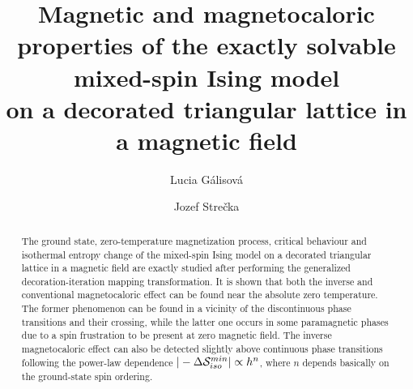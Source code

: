 \documentclass[final,5p,times,sort&compress]{elsarticle}
\begin{document}
\begin{frontmatter}



\title{Magnetic and magnetocaloric properties of the exactly solvable mixed-spin Ising model \\
on a decorated triangular lattice in a magnetic field}


\author[label1]{Lucia G\'alisov\'a}
\author[label2]{Jozef Stre\v{c}ka}

\address[label1]{Department of Applied Mathematics and Informatics,
					Faculty of Mechanical Engineering, Technical University,
					Letn\'a 9, 042 00 Ko\v{s}ice, Slovakia}
\address[label2]{Department of Theoretical Physics and Astrophysics, Institute of Physics,
                    Faculty of Science, P. J. \v{S}af\'arik University,
                    Park Angelinum 9, 040 01 Ko\v{s}ice, Slovakia}

\begin{abstract}
The ground state, zero-temperature magnetization process, critical behaviour and isothermal entropy change of the mixed-spin Ising model on a decorated triangular lattice in a magnetic field are exactly studied after performing the generalized decoration-iteration mapping transformation. It is shown that both the inverse and conventional magnetocaloric effect can be found near the absolute zero temperature. The former phenomenon can be found in a vicinity of the discontinuous phase transitions and their crossing, while the latter one occurs in some paramagnetic phases due to a spin frustration to be present at zero magnetic field. The inverse magnetocaloric effect can also be detected slightly above continuous phase transitions following the power-law dependence $|-\Delta{\cal S}_{iso}^{min}|\propto h^n$, where $n$ depends basically on the ground-state spin ordering.
\end{abstract}


\end{frontmatter}
\end{document}
